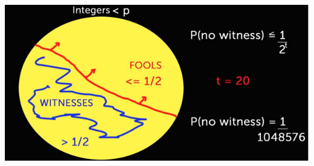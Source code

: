 \documentclass{report}
\begin{document}
 \begin{center}
	\includegraphics[scale=1]{93.png}
\end{center}
\end{document}

